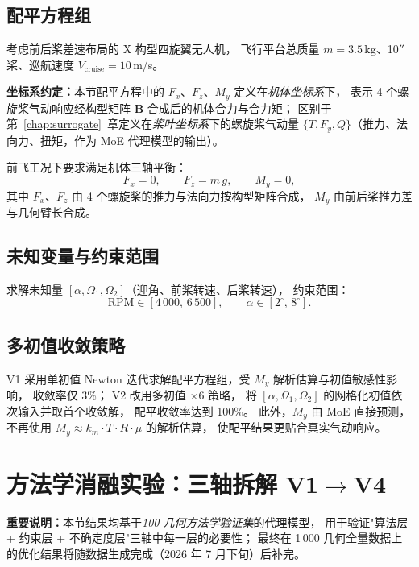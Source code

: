 \subsection{配平方程组}

考虑前后桨差速布局的 X 构型四旋翼无人机，
飞行平台总质量 $m = 3.5$\,kg、10$''$ 桨、巡航速度 $V_{\text{cruise}} = 10$\,m/s。

\textbf{坐标系约定：}本节配平方程中的 $F_x$、$F_z$、$M_y$ 定义在\emph{机体坐标系}下，
表示 4 个螺旋桨气动响应经构型矩阵 $\mathbf{B}$ 合成后的机体合力与合力矩；
区别于第~\ref{chap:surrogate}~章定义在\emph{桨叶坐标系}下的螺旋桨气动量
$\{T, F_y, Q\}$（推力、法向力、扭矩，作为 MoE 代理模型的输出）。

前飞工况下要求满足机体三轴平衡：
\begin{equation}
F_x = 0, \qquad F_z = m\,g, \qquad M_y = 0,
\end{equation}
其中 $F_x$、$F_z$ 由 4 个螺旋桨的推力与法向力按构型矩阵合成，
$M_y$ 由前后桨推力差与几何臂长合成。

\subsection{未知变量与约束范围}

求解未知量 $[\alpha, \Omega_1, \Omega_2]$（迎角、前桨转速、后桨转速），
约束范围：
\begin{equation}
\text{RPM} \in [4\,000,\,6\,500], \qquad \alpha \in [2^\circ,\,8^\circ].
\end{equation}

\subsection{多初值收敛策略}

V1 采用单初值 Newton 迭代求解配平方程组，受 $M_y$ 解析估算与初值敏感性影响，
收敛率仅 3\%；
V2 改用多初值 $\times 6$ 策略，
将 $[\alpha, \Omega_1, \Omega_2]$ 的网格化初值依次输入并取首个收敛解，
配平收敛率达到 100\%。
此外，$M_y$ 由 MoE 直接预测，
不再使用 $M_y \approx k_m \cdot T \cdot R \cdot \mu$ 的解析估算，
使配平结果更贴合真实气动响应。

\section{方法学消融实验：三轴拆解 V1$\to$V4}
\label{sec:ablation}

\textbf{重要说明：}本节结果均基于\emph{100 几何方法学验证集}的代理模型，
用于验证"算法层 + 约束层 + 不确定度层"三轴中每一层的必要性；
最终在 1\,000 几何全量数据上的优化结果将随数据生成完成（2026 年 7 月下旬）后补完。

